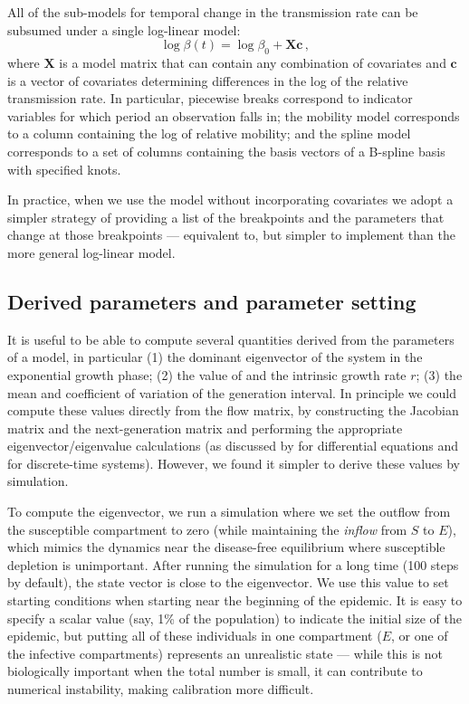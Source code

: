 \documentclass[12pt]{article}\usepackage[]{graphicx}\usepackage[]{color}
\begin{document}
All of the sub-models for temporal change in the transmission
rate can be subsumed under a single log-linear model:
\begin{equation}\label{eq:betamodel}
\log \beta(t) = \log \beta_0 + \boldsymbol{X}\boldsymbol{c}
\,,
\end{equation}
where $\boldsymbol{X}$ is a model matrix that can contain any combination
of covariates and $\boldsymbol{c}$ is a vector of covariates determining
differences in the log of the relative transmission rate.
In particular, piecewise breaks correspond to indicator variables
for which period an observation falls in; the mobility model corresponds to a column
containing the log of relative mobility; and the spline model corresponds to a set of
columns containing the basis vectors of a B-spline basis with specified knots.

In practice, when we use the model without incorporating covariates we adopt a simpler strategy of providing a list of the breakpoints and the parameters that change at those breakpoints --- equivalent to, but simpler to implement than the more general log-linear model.


\subsection*{Derived parameters and parameter setting}

It is useful to be able to compute several quantities derived from the parameters of a model, in particular (1) the dominant eigenvector of the system in the exponential growth phase; (2) the value of \Rzero and the intrinsic growth rate $r$; (3) the mean and coefficient of variation of the generation interval. In principle we could compute these values directly from the flow matrix, by constructing the Jacobian matrix and the next-generation matrix and performing the appropriate eigenvector/eigenvalue calculations (as discussed by \cite{VandWatm02} for differential equations and \cite{Casw00} for discrete-time systems). However, we found it simpler to derive these values by simulation.

To compute the eigenvector, we run a simulation where we set the outflow from the susceptible compartment to zero (while maintaining the \emph{inflow} from $S$ to $E$), which mimics the dynamics near the disease-free equilibrium where susceptible depletion is unimportant. After running the simulation for a long time (100 steps by default), the state vector is close to the eigenvector.  We use this value to set starting conditions when starting near the beginning of the epidemic. It is easy to specify a scalar value (say, 1\% of the population) to indicate the initial size of the epidemic, but putting all of these individuals in one compartment ($E$, or one of the infective compartments) represents an unrealistic state --- while this is not biologically important when the total number is small, it can contribute to numerical instability, making calibration more difficult.
\end{document}
